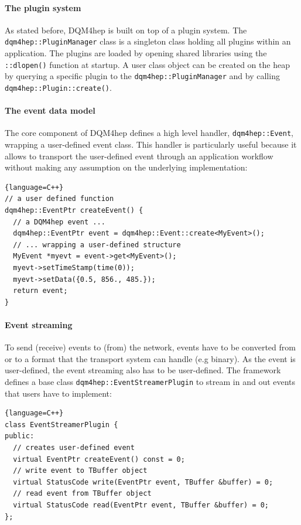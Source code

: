 \documentclass{webofc}
\begin{document}
\paragraph{The plugin system}

As stated before, DQM4hep is built on top of a plugin system. 
The \texttt{dqm4hep::PluginManager} class is a singleton class holding all plugins within an application. 
The plugins are loaded by opening shared libraries using the \texttt{::dlopen()} function at startup. 
A user class object can be created on the heap by querying a specific plugin to the \texttt{dqm4hep::PluginManager} and 
by calling \texttt{dqm4hep::Plugin::create()}.

\paragraph{The event data model}

The core component of DQM4hep defines a high level handler, \texttt{dqm4hep::Event}, wrapping a user-defined event class.
This handler is particularly useful because it allows to transport the user-defined event through an application
workflow without making any assumption on the underlying implementation:

\begin{lstlisting}{language=C++}
// a user defined function
dqm4hep::EventPtr createEvent() {
  // a DQM4hep event ...
  dqm4hep::EventPtr event = dqm4hep::Event::create<MyEvent>();
  // ... wrapping a user-defined structure
  MyEvent *myevt = event->get<MyEvent>();
  myevt->setTimeStamp(time(0));
  myevt->setData({0.5, 856., 485.});
  return event;
}
\end{lstlisting}

\paragraph{Event streaming}

To send (receive) events to (from) the network, events have to be converted from or to a format that the transport system can handle (e.g binary). 
As the event is user-defined, the event streaming also has to be user-defined. 
The framework defines a base class \texttt{dqm4hep::EventStreamerPlugin} to stream in and out events that users have to implement:

\begin{lstlisting}{language=C++}
class EventStreamerPlugin {
public:
  // creates user-defined event
  virtual EventPtr createEvent() const = 0;
  // write event to TBuffer object
  virtual StatusCode write(EventPtr event, TBuffer &buffer) = 0;
  // read event from TBuffer object
  virtual StatusCode read(EventPtr event, TBuffer &buffer) = 0;
};
\end{lstlisting}
\end{document}
